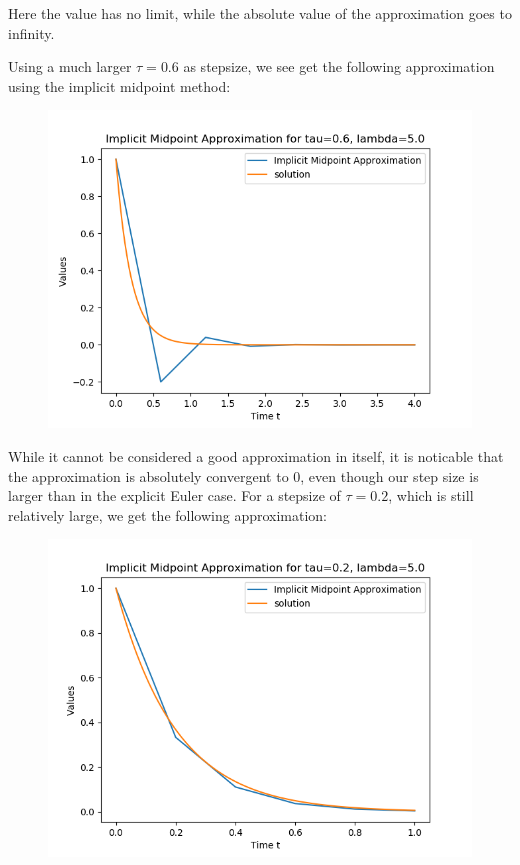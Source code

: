 \documentclass{article}
\theoremstyle{definition}
\begin{document}
\begin{itemize}
\begin{figure}[H]
		\end{figure}
		Here the value has no limit, while the absolute value of the
		approximation goes to infinity.

		Using a much larger $\tau = 0.6$ as stepsize, we see get the
		following approximation using
		the implicit midpoint method:
		\begin{figure}[H]
			\includegraphics[scale=0.6]{implicit_mid_06}
		\end{figure}
		While it cannot be considered a good approximation in itself, it
		is noticable that the approximation is absolutely convergent to
		$0$, even though our step size is larger than in the explicit
		Euler case. For a stepsize of $\tau=0.2$, which is still
		relatively large, we get the following approximation:
		\begin{figure}[H]
			\includegraphics[scale=0.6]{implicit_mid_02}

\end{figure}
\end{itemize}
\end{document}
